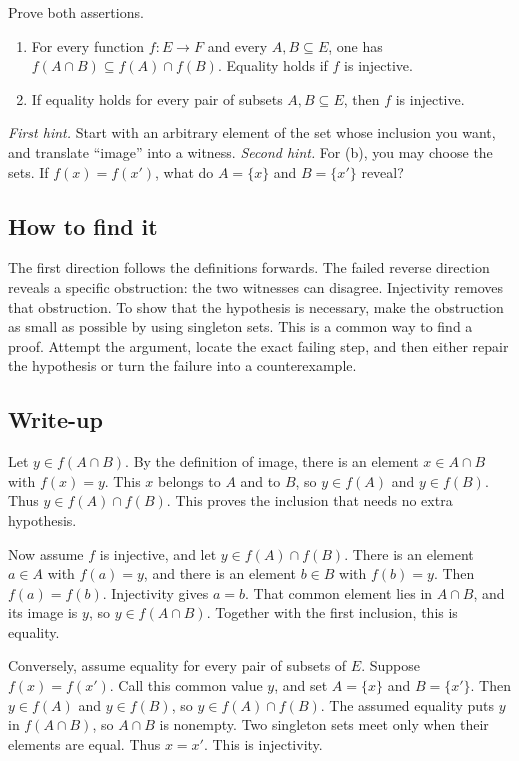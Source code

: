 Prove both assertions.
\begin{enumerate}[label=(\alph*)]
\item For every function $f:E\to F$ and every $A,B\subseteq E$, one has $f(A\cap B)\subseteq f(A)\cap f(B)$. Equality holds if $f$ is injective.
\item If equality holds for every pair of subsets $A,B\subseteq E$, then $f$ is injective.
\end{enumerate}
\emph{First hint.} Start with an arbitrary element of the set whose inclusion you want, and translate ``image'' into a witness.
\emph{Second hint.} For (b), you may choose the sets. If $f(x)=f(x')$, what do $A=\{x\}$ and $B=\{x'\}$ reveal?

\subsection*{How to find it}

The first direction follows the definitions forwards. The failed reverse direction reveals a specific obstruction: the two witnesses can disagree. Injectivity removes that obstruction. To show that the hypothesis is necessary, make the obstruction as small as possible by using singleton sets. This is a common way to find a proof. Attempt the argument, locate the exact failing step, and then either repair the hypothesis or turn the failure into a counterexample.

\subsection*{Write-up}

Let $y\in f(A\cap B)$. By the definition of image, there is an element $x\in A\cap B$ with $f(x)=y$. This $x$ belongs to $A$ and to $B$, so $y\in f(A)$ and $y\in f(B)$. Thus $y\in f(A)\cap f(B)$. This proves the inclusion that needs no extra hypothesis.

Now assume $f$ is injective, and let $y\in f(A)\cap f(B)$. There is an element $a\in A$ with $f(a)=y$, and there is an element $b\in B$ with $f(b)=y$. Then $f(a)=f(b)$. Injectivity gives $a=b$. That common element lies in $A\cap B$, and its image is $y$, so $y\in f(A\cap B)$. Together with the first inclusion, this is equality.

Conversely, assume equality for every pair of subsets of $E$. Suppose $f(x)=f(x')$. Call this common value $y$, and set $A=\{x\}$ and $B=\{x'\}$. Then $y\in f(A)$ and $y\in f(B)$, so $y\in f(A)\cap f(B)$. The assumed equality puts $y$ in $f(A\cap B)$, so $A\cap B$ is nonempty. Two singleton sets meet only when their elements are equal. Thus $x=x'$. This is injectivity.

